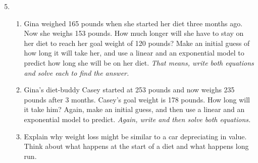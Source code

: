 \begin{enumerate} 
\setcounter{enumi}{4}

\item 
\begin{enumerate} 
\item 
Gina weighed 165 pounds when she started her diet three months ago.  Now she weighs 153 pounds.  How much longer will she have to stay on her diet to reach her goal weight of 120 pounds?  Make an initial guess of how long it will take her, and use a linear and an exponential model to predict how long she will be on her diet.  \emph{That means, write both equations and solve each to find the answer.} 
\item Gina's diet-buddy Casey started at 253 pounds and now weighs 235 pounds after 3 months.  Casey's goal weight is 178 pounds.  How long will it take him?  Again, make an initial guess, and then use a linear and an exponential model to predict. \emph{Again, write and then solve both equations.}
\item Explain why weight loss might be similar to a car depreciating in value.  Think about what happens at the start of a diet and what happens long run.
\end{enumerate}


\end{enumerate}
